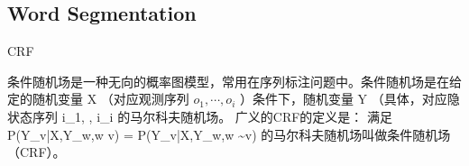 \subsection{Word Segmentation}
\label{sec:cws}

CRF~\cite{lafferty2001conditional}

条件随机场是一种无向的概率图模型，常用在序列标注问题中。条件随机场是在给定的随机变量 X （对应观测序列 $o_{1}, \cdots, o_{i}$ ）条件下，随机变量 Y （具体，对应隐状态序列 i_{1}, \cdots, i_{i} 的马尔科夫随机场。
广义的CRF的定义是： 满足 P(Y_{v}|X,Y_{w},w \neq v) = P(Y_{v}|X,Y_{w},w \sim v)  的马尔科夫随机场叫做条件随机场（CRF）。